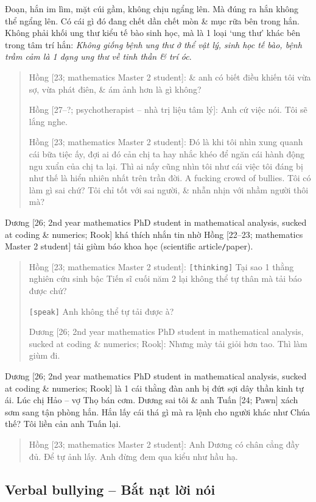 \documentclass[12pt,twoside]{book}
\begin{document}
Đoạn, hắn im lìm, mặt cúi gầm, không chịu ngẩng lên. Mà đúng ra hắn không thể ngẩng lên. Có cái gì đó đang chết dần chết mòn \& mục rữa bên trong hắn. Không phải khối ung thư kiểu tế bào sinh học, mà là 1 loại `ung thư' khác bên trong tâm trí hắn: {\it Không giống bệnh ung thư ở thể vật lý, sinh học tế bào, bệnh trầm cảm là 1 dạng ung thư về tinh thần \& trí óc}.
\begin{quote}
	{\sf Hồng [23; mathematics Master 2 student]}: \& anh có biết điều khiến tôi vừa sợ, vừa phát điên, \& ám ảnh hơn là gì không?
	
	{\sf Hồng [27--?; psychotherapist -- nhà trị liệu tâm lý]}: Anh cứ việc nói. Tôi sẽ lắng nghe.
	
	{\sf Hồng [23; mathematics Master 2 student]}: Đó là khi tôi nhìn xung quanh cái bữa tiệc ấy, đợi ai đó cản chị ta hay nhắc khéo để ngăn cái hành động ngu xuẩn của chị ta lại. Thì ai nấy cũng nhìn tôi như cái việc tôi đáng bị như thế là hiển nhiên nhất trên trần đời. A fucking crowd of bullies. Tôi có làm gì sai chứ? Tôi chỉ tốt với sai người, \& nhẫn nhịn với nhầm người thôi mà?
\end{quote}
{\sf Dương [26; 2nd year mathematics PhD student in mathematical analysis, sucked at coding \& numerics; Rook]} khá thích nhắn tin nhờ {\sf Hồng [22--23; mathematics Master 2 student]} tải giùm báo khoa học (scientific article{\tt/}paper).
\begin{quote}
	{\sf Hồng [23; mathematics Master 2 student]}: {\tt[thinking]} Tại sao 1 thằng nghiên cứu sinh bậc Tiến sĩ cuối năm 2 lại không thể tự thân mà tải báo được chứ?
	
	{\tt[speak]} Anh không thể tự tải được à?
	
	{\sf Dương [26; 2nd year mathematics PhD student in mathematical analysis, sucked at coding \& numerics; Rook]}: Nhưng mày tải giỏi hơn tao. Thì làm giùm đi.
\end{quote}
{\sf Dương [26; 2nd year mathematics PhD student in mathematical analysis, sucked at coding \& numerics; Rook]} là 1 cái thằng đàn anh bị đứt sợi dây thần kinh tự ái. Lúc chị Hảo -- vợ Thọ bán cơm. Dương sai tôi \& anh {\sf Tuấn [24; Pawn]} xách sơm sang tận phòng hắn. Hắn lấy cái thá gì mà ra lệnh cho người khác như Chúa thế? Tôi liền cản anh Tuấn lại.
\begin{quote}
	{\sf Hồng [23; mathematics Master 2 student]}: Anh Dương có chân cẳng đầy đủ. Để tự ảnh lấy. Anh đừng đem qua kiểu như hầu hạ.
\end{quote}

\subsection{Verbal bullying -- Bắt nạt lời nói}
\end{document}
